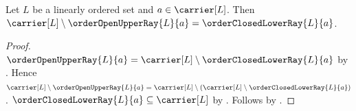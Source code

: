 \begin{proposition}\label{order_complement_open_upper_ray}
    Let $L$ be a linearly ordered set and $a\in\carrier[L]$.
    Then $\carrier[L]\setminus\orderOpenUpperRay{L}{a}
        =\orderClosedLowerRay{L}{a}$.
\end{proposition}
\begin{proof}
    $\orderOpenUpperRay{L}{a}
        =\carrier[L]\setminus\orderClosedLowerRay{L}{a}$ by
        .
    Hence $\carrier[L]\setminus\orderOpenUpperRay{L}{a}
        =\carrier[L]\setminus
            (\carrier[L]\setminus\orderClosedLowerRay{L}{a})$.
    $\orderClosedLowerRay{L}{a}\subseteq\carrier[L]$ by
        .
    Follows by .
\end{proof}
